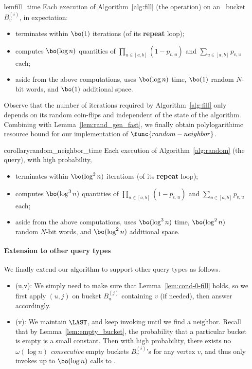 \begin{restatable}{lem}{fill_time}
\label{lem:fill_time}
Each execution of Algorithm~\ref{alg:fill} (the  operation) on an \unfilled~bucket $B_v^{(i)}$, in expectation:
\begin{itemize}
\item terminates within $\bo(1)$ iterations (of its \textup{\textbf{repeat}} loop);
\item computes $\bo(\log n)$ quantities of $\prod_{u \in [a,b]} (1-p_{v,u})$ and $\sum_{u\in[a,b]} p_{v,u}$ each;
\item aside from the above computations, uses $\bo(\log n)$ time, $\bo(1)$ random $N$-bit words, and $\bo(1)$ additional space.
\end{itemize}
\end{restatable}

Observe that the number of iterations required by Algorithm~\ref{alg:fill} only depends on its random coin-flips and independent of the state of the algorithm.
Combining with Lemma~\ref{lem:rand_gen_fast}, we finally obtain polylogarithimc resource bound for our implementation of $\func{random-neighbor}$.

\begin{restatable}{corollary}{random_neighbor_time}
\label{cor:random_neighbor_time}
Each execution of Algorithm~\ref{alg:random} (the  query), with high probability,
\begin{itemize}
\item terminates within $\bo(\log^2 n)$ iterations (of its \textup{\textbf{repeat}} loop);
\item computes $\bo(\log^3 n)$ quantities of $\prod_{u \in [a,b]} (1-p_{v,u})$ and $\sum_{u\in[a,b]} p_{v,u}$ each;
\item aside from the above computations, uses $\bo(\log^3 n)$ time, $\bo(\log^2 n)$ random $N$-bit words, and $\bo(\log^2 n)$ additional space.
\end{itemize}
\end{restatable}

\paragraph{Extension to other query types}
We finally extend our algorithm to support other query types as follows.
\begin{itemize}
\item {}(u,v): We simply need to make sure that Lemma~\ref{lem:cond-0-fill} holds, so we first apply $(u,j)$ on bucket $B_u^{(j)}$ containing $v$ (if needed), then answer accordingly.
\item {}(v): We maintain $\LAST$, and keep invoking  until we find a neighbor. Recall that by Lemma~\ref{lem:empty_bucket}, the probability that a particular bucket is empty is a small constant. Then with high probability, there exists no $\omega(\log n)$ \emph{consecutive} empty buckets $B_v^{(i)}$'s for any vertex $v$, and thus  only invokes up to $\bo(\log n)$ calls to .
\end{itemize}

